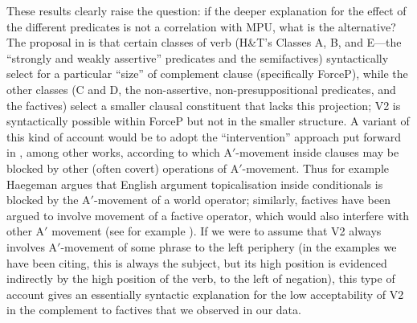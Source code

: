 \documentclass[output=paper]{LSP/langsci}
\begin{document}
These results clearly raise the question: if the deeper explanation for the effect of the different predicates is not a correlation with MPU, what is the alternative?
%
The proposal in \cite{wiklund-etal09} is that certain classes of verb (H\&T's Classes A, B, and E---the ``strongly and weakly assertive'' predicates and the semifactives) syntactically select for a particular ``size'' of complement clause (specifically ForceP), while the other classes (C and D, the non-assertive, non-presuppositional predicates, and the factives) select a smaller clausal constituent that lacks this projection; V2 is syntactically possible within ForceP but not in the smaller structure.  A variant of this kind of account would be to adopt the ``intervention'' approach put forward in \cite{haegeman10conditionals,haegeman12syntax}, among other works, according to which A$'$-movement inside clauses may be blocked by other (often covert) operations of A$'$-movement. Thus for example Haegeman argues that English argument topicalisation inside conditionals is blocked by the A$'$-movement of a world operator; similarly, factives have been argued to involve movement of a factive operator, which would also interfere with other A$'$ movement (see for example \citealt{zanuttini-portner03}). If we were to assume that V2 always involves A$'$-movement of some phrase to the left periphery (in the examples we have been citing, this is always the subject, but its high position is evidenced indirectly by the high position of the verb, to the left of negation), this type of account gives an essentially syntactic explanation for the low acceptability of V2 in the complement to factives that we observed in our data. %
\end{document}
